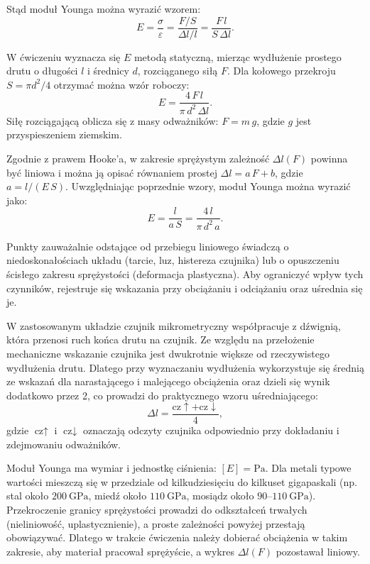 \documentclass{fizykalab}
\begin{document}
Stąd moduł Younga można wyrazić wzorem:
$$
E = \frac{\sigma}{\varepsilon} = \frac{F/S}{\Delta l / l}
= \frac{F\,l}{S\,\Delta l}.
$$

W ćwiczeniu wyznacza się \( E \) metodą statyczną, mierząc wydłużenie
prostego drutu o długości \( l \) i średnicy
\( d \), rozciąganego siłą \( F \). Dla kołowego przekroju
\( S = \pi d^{2}/4 \) otrzymać można wzór roboczy:
$$
E = \frac{4\,F\,l}{\pi\,d^{2}\,\Delta l}.
$$
Siłę rozciągającą oblicza się z masy odważników:
\( F = m\,g \), gdzie \( g \) jest przyspieszeniem ziemskim.

\bigskip
Zgodnie z prawem Hooke'a, w zakresie sprężystym zależność
\( \Delta l(F) \) powinna być liniowa i można ją opisać równaniem
prostej \( \Delta l = a\,F + b \), gdzie \( a = l/(E\,S) \).
Uwzględniając poprzednie wzory, moduł Younga można wyrazić jako:
$$
E = \frac{l}{a\,S} = \frac{4\,l}{\pi\,d^{2}\,a}.
$$

Punkty zauważalnie odstające od przebiegu liniowego świadczą o
niedoskonałościach układu (tarcie, luz, histereza czujnika) lub o
opuszczeniu ścisłego zakresu sprężystości (deformacja plastyczna). Aby ograniczyć wpływ tych
czynników, rejestruje się wskazania przy obciążaniu i odciążaniu oraz
uśrednia się je.

W zastosowanym układzie czujnik mikrometryczny współpracuje z dźwignią,
która przenosi ruch końca drutu na czujnik. Ze względu na przełożenie
mechaniczne wskazanie czujnika jest dwukrotnie większe od rzeczywistego
wydłużenia drutu. Dlatego przy wyznaczaniu wydłużenia wykorzystuje się
średnią ze wskazań dla narastającego i malejącego obciążenia oraz dzieli
się wynik dodatkowo przez 2, co prowadzi do praktycznego wzoru
uśredniającego:
$$
\Delta l = \frac{\text{cz} \uparrow + \text{cz} \downarrow}{4},
$$
gdzie \( \text{cz} \uparrow \) i \( \text{cz} \downarrow \) oznaczają
odczyty czujnika odpowiednio przy dokładaniu i zdejmowaniu odważników.

Moduł Younga ma wymiar i jednostkę ciśnienia: \( [E] = \mathrm{Pa} \).
Dla metali typowe wartości mieszczą się w przedziale od kilkudziesięciu
do kilkuset gigapaskali (np. stal około \( 200\ \mathrm{GPa} \),
  miedź około \( 110\ \mathrm{GPa} \), mosiądz około \( 90\text{--}110\
\mathrm{GPa} \)). Przekroczenie granicy sprężystości prowadzi do
odkształceń trwałych (nieliniowość, uplastycznienie), a proste zależności
powyżej przestają obowiązywać. Dlatego w trakcie ćwiczenia należy dobierać
obciążenia w takim zakresie, aby materiał pracował sprężyście, a wykres
\( \Delta l(F) \) pozostawał liniowy.
\end{document}
